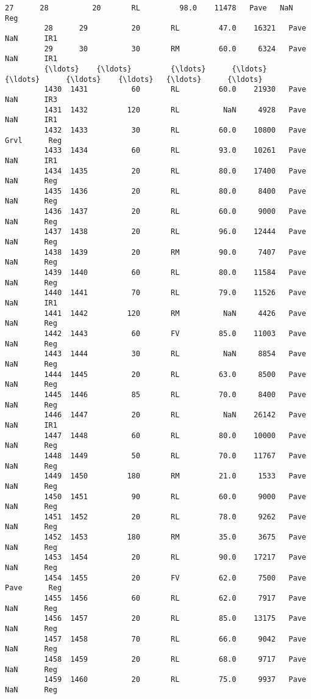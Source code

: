 \documentclass[11pt]{article}
\begin{document}
\begin{Verbatim}[commandchars=\\\{\}]
         27      28          20       RL         98.0    11478   Pave   NaN      Reg   
         28      29          20       RL         47.0    16321   Pave   NaN      IR1   
         29      30          30       RM         60.0     6324   Pave   NaN      IR1   
         {\ldots}    {\ldots}         {\ldots}      {\ldots}          {\ldots}      {\ldots}    {\ldots}   {\ldots}      {\ldots}   
         1430  1431          60       RL         60.0    21930   Pave   NaN      IR3   
         1431  1432         120       RL          NaN     4928   Pave   NaN      IR1   
         1432  1433          30       RL         60.0    10800   Pave  Grvl      Reg   
         1433  1434          60       RL         93.0    10261   Pave   NaN      IR1   
         1434  1435          20       RL         80.0    17400   Pave   NaN      Reg   
         1435  1436          20       RL         80.0     8400   Pave   NaN      Reg   
         1436  1437          20       RL         60.0     9000   Pave   NaN      Reg   
         1437  1438          20       RL         96.0    12444   Pave   NaN      Reg   
         1438  1439          20       RM         90.0     7407   Pave   NaN      Reg   
         1439  1440          60       RL         80.0    11584   Pave   NaN      Reg   
         1440  1441          70       RL         79.0    11526   Pave   NaN      IR1   
         1441  1442         120       RM          NaN     4426   Pave   NaN      Reg   
         1442  1443          60       FV         85.0    11003   Pave   NaN      Reg   
         1443  1444          30       RL          NaN     8854   Pave   NaN      Reg   
         1444  1445          20       RL         63.0     8500   Pave   NaN      Reg   
         1445  1446          85       RL         70.0     8400   Pave   NaN      Reg   
         1446  1447          20       RL          NaN    26142   Pave   NaN      IR1   
         1447  1448          60       RL         80.0    10000   Pave   NaN      Reg   
         1448  1449          50       RL         70.0    11767   Pave   NaN      Reg   
         1449  1450         180       RM         21.0     1533   Pave   NaN      Reg   
         1450  1451          90       RL         60.0     9000   Pave   NaN      Reg   
         1451  1452          20       RL         78.0     9262   Pave   NaN      Reg   
         1452  1453         180       RM         35.0     3675   Pave   NaN      Reg   
         1453  1454          20       RL         90.0    17217   Pave   NaN      Reg   
         1454  1455          20       FV         62.0     7500   Pave  Pave      Reg   
         1455  1456          60       RL         62.0     7917   Pave   NaN      Reg   
         1456  1457          20       RL         85.0    13175   Pave   NaN      Reg   
         1457  1458          70       RL         66.0     9042   Pave   NaN      Reg   
         1458  1459          20       RL         68.0     9717   Pave   NaN      Reg   
         1459  1460          20       RL         75.0     9937   Pave   NaN      Reg   
         

\end{Verbatim}
\end{document}
